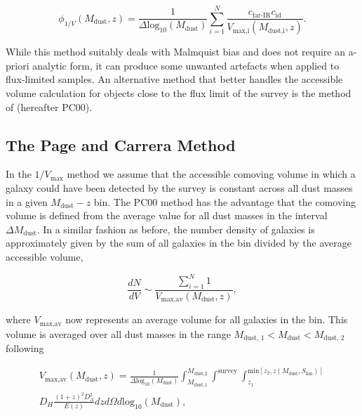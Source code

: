 \begin{equation}
    \phi_{1/V}(M_{\textrm{dust}},z) = \frac{1}{\Delta \textrm{log}_{10}(M_{\textrm{dust}})} \sum_{i=1}^N \frac{c_{\scriptscriptstyle \textrm{far-IR}} c_{\scriptscriptstyle \textrm{id}}}{V_{\textrm{max,i}}(M_{\textrm{dust,i}},z)}.
\label{eq:phi_1/v_method}
\end{equation}

While this method suitably deals with Malmquist bias and does not require an a-priori analytic form, it can produce some unwanted artefacts when applied to flux-limited samples. An alternative method that better handles the accessible volume calculation for objects close to the flux limit of the survey is the method of \citealt{Page_2000} (hereafter PC00).

\subsection{The Page and Carrera Method}

In the $1/V_{\textrm{max}}$ method we assume that the accessible comoving volume in which a galaxy could have been detected by the survey is constant across all dust masses in a given $M_{\textrm{dust}} - z$ bin. The PC00 method has the advantage that the comoving volume is defined from the average value for all dust masses in the interval $\Delta M_{\textrm{dust}}$. In a similar fashion as before, the number density of galaxies is approximately given by the sum of all galaxies in the bin divided by the average accessible volume, 

\begin{equation}
    \frac{dN}{dV} \sim \frac{\sum_{i=1}^N 1}{V_{\textrm{max,av}}(M_{\textrm{dust}},z)},
\label{eq:number_density_pc00_method}
\end{equation}

\noindent where $V_{\textrm{max,av}}$ now represents an average volume for all galaxies in the bin. This volume is averaged over all dust masses in the range $M_{\textrm{dust, 1}} < M_{\textrm{dust}} < M_{\textrm{dust, 2}}$ following

\begin{multline}
    V_{\textrm{max,av}}(M_{\textrm{dust}},z) = \frac{1}{\Delta \textrm{log}_{10}(M_\textrm{dust})}\int_{\scriptscriptstyle M_{\textrm{dust,1}}}^{\scriptscriptstyle M_{\textrm{dust,2}}} \int^{\scriptscriptstyle \textrm{survey}} \int_{\scriptscriptstyle z_1}^{\scriptscriptstyle \textrm{min}[z_2, z(M_{\textrm{dust}},S_{\textrm{lim}})]} \\ D_H \frac{(1+z)^2 D_A^2}{E(z)} dz d\Omega d\textrm{log}_{10}(M_\textrm{dust}),
\label{eq:volume_pc00_method}
\end{multline}

